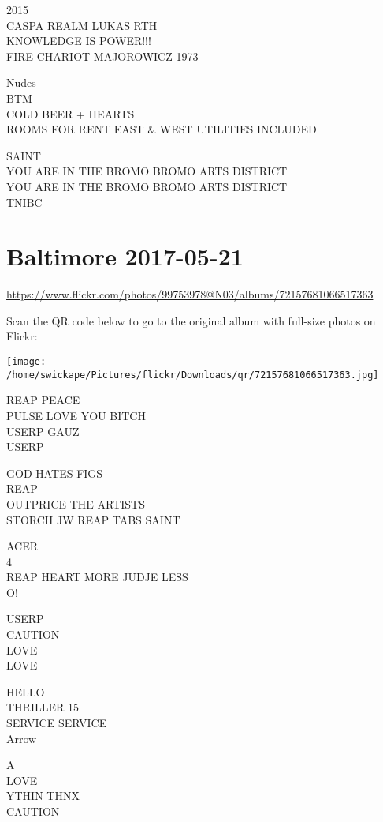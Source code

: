 \documentclass[10pt,letterpaper]{article}
\begin{document}
2015\\
CASPA REALM LUKAS RTH\\
KNOWLEDGE IS POWER!!!\\
FIRE CHARIOT MAJOROWICZ 1973

Nudes\\
BTM\\
COLD BEER + HEARTS\\
ROOMS FOR RENT EAST \& WEST UTILITIES INCLUDED

SAINT\\
YOU ARE IN THE BROMO BROMO ARTS DISTRICT\\
YOU ARE IN THE BROMO BROMO ARTS DISTRICT\\
TNIBC


\section*{Baltimore 2017-05-21}

\url{https://www.flickr.com/photos/99753978@N03/albums/72157681066517363}

Scan the QR code below to go to the original album with full-size photos on Flickr:

\texttt{[image: /home/swickape/Pictures/flickr/Downloads/qr/72157681066517363.jpg]}


REAP PEACE\\
PULSE LOVE YOU BITCH\\
USERP GAUZ\\
USERP

GOD HATES FIGS\\
REAP\\
OUTPRICE THE ARTISTS\\
STORCH JW REAP TABS SAINT

ACER\\
4\\
REAP HEART MORE JUDJE LESS\\
O!

USERP\\
CAUTION\\
LOVE\\
LOVE

HELLO\\
THRILLER 15\\
SERVICE SERVICE\\
Arrow

A\\
LOVE\\
YTHIN THNX\\
CAUTION
\end{document}
